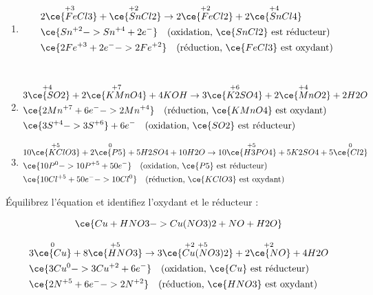\documentclass[
  11pt,
  french,
  a4paper,
  openany]{book}
\providecommand{\tightlist}{%
  \setlength{\itemsep}{0pt}\setlength{\parskip}{0pt}}
\begin{document}
\begin{Answer}

\begin{enumerate}
\def\labelenumi{\alph{enumi}.}
\tightlist
\item
  \[
  \begin{split}
  & 2 \overset{+3\ }{\ce{FeCl3}} + \overset{+2\ }{\ce{SnCl2}} \rightarrow 2 \overset{+2\ }{\ce{FeCl2}} + 2 \overset{+4\ }{\ce{SnCl4}} \\
  & \ce{ Sn^{+2} -> Sn^{+4} + 2 e^-} \quad \text{(oxidation, $\ce{SnCl2}$ est réducteur)} \\
  & \ce{ 2 Fe^{+3} + 2 e^- -> 2 Fe^{+2}} \quad \text{(réduction, $\ce{FeCl3}$ est oxydant)}
  \end{split}
  \]\\
\item
  \[
  \begin{split}
  & 3 \overset{+4\ }{\ce{SO2}} + 2 \overset{+7}{\ce{KMnO4}} + 4 KOH \rightarrow 3 \overset{+6}{\ce{K2SO4}} + 2 \overset{+4\ }{\ce{MnO2}} + 2 H2O \\
  & \ce{ 2 Mn^{+7} + 6e^- -> 2 Mn^{+4}} \quad \text{(réduction, $\ce{KMnO4}$ est oxydant)} \\
  & \ce{ 3 S^{+4} -> 3 S^{+6}} + 6e^- \quad \text{(oxidation, $\ce{SO2}$ est réducteur)}
  \end{split}
  \]
\item
  \[
  \begin{split}
  & 10 \overset{+5}{\ce{KClO3}} + 2 \overset{0}{\ce{P5}} + 5 H2SO4 + 10 H2O \rightarrow 10 \overset{+5}{\ce{H3PO4}} + 5 K2SO4 + 5 \overset{0}{\ce{Cl2}} \\
  & \ce{ 10 P^{0} -> 10 P^{+5} + 50 e^-} \quad \text{(oxidation, $\ce{P5}$ est réducteur)} \\
  & \ce{ 10 Cl^{+5} + 50 e^- -> 10 Cl^{0}} \quad \text{(réduction, $\ce{KClO3}$ est oxydant)}
  \end{split}
  \]
\end{enumerate}


\end{Answer}

\begin{Exercise}
Équilibrez l'équation et identifiez l'oxydant et le réducteur :

\[
\ce{ Cu + HNO3 -> Cu(NO3)2 + NO + H2O}
\]

\end{Exercise}

\begin{Answer}
\[
\begin{split}
& 3 \overset{0}{\ce{Cu}} + 8 \overset{+5}{\ce{HNO3}} \rightarrow 3 \overset{+2\ +5\ }{\ce{Cu(NO3)2}} + 2 \overset{+2\ }{\ce{NO}} + 4 H2O \\
& \ce{ 3 Cu^{0} -> 3 Cu^{+2} + 6 e^-} \quad \text{(oxidation, $\ce{Cu}$ est réducteur)} \\
& \ce{ 2 N^{+5} + 6 e^- -> 2 N^{+2}} \quad \text{(réduction, $\ce{HNO3}$ est oxydant)}
\end{split}
\]

\end{Answer}
\end{document}

